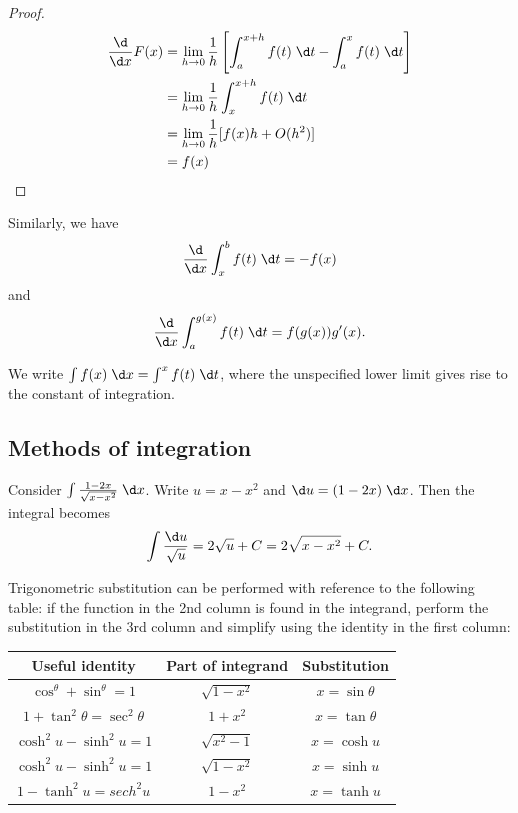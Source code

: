 \documentclass[a4paper]{article}
\begin{document}
\begin{proof}
  \begin{align*}
    \frac{\d}{\d x}F(x) &= \lim_{h\to 0}\frac{1}{h}\left[\int_a^{x+h}f(t)\;\d t - \int_a^x f(t)\;\d t\right]\\
    &= \lim_{h\to 0} \frac{1}{h}\int_x^{x+h}f(t) \;\d t\\
    &= \lim_{h\to 0} \frac{1}{h}[f(x)h + O(h^2)]\\
    &= f(x)
  \end{align*}
\end{proof}
Similarly, we have 
\[
\frac{\d}{\d x}\int_x^b f(t)\;\d t = -f(x)
\]
and
\[
\frac{\d}{\d x}\int_a^{g(x)} f(t)\;\d t = f(g(x))g'(x).
\]

\begin{notation}
  We write $\int f(x)\;\d x= \int^x f(t)\;\d t$, where the unspecified lower limit gives rise to the constant of integration.
\end{notation}

\subsection{Methods of integration}
\begin{eg}
  Consider $\int \frac{1 - 2x}{\sqrt{x - x^2}}\;\d x$. Write $u = x - x^2$ and $\d u = (1 - 2x)\;\d x$. Then the integral becomes
\[
\int \frac{\d u}{\sqrt{u}} = 2\sqrt{u} + C = 2\sqrt{x - x^2} + C.
\]
\end{eg}

Trigonometric substitution can be performed with reference to the following table: if the function in the 2nd column is found in the integrand, perform the substitution in the 3rd column and simplify using the identity in the first column:

\vspace{4pt}
\noindent
\begin{tabular}{ccc}
\toprule
Useful identity                   & Part of integrand & Substitution      \\
\midrule
$\cos^\theta + \sin^\theta = 1$   & $\sqrt{1 - x^2}$  & $x = \sin \theta$ \\
$1 + \tan^2\theta = \sec^2\theta$ & $1 + x^2$         & $x = \tan\theta$  \\
$\cosh^2u - \sinh^2 u = 1$        & $\sqrt{x^2 - 1}$  & $x=\cosh u$       \\
$\cosh^2u - \sinh^2 u = 1$        & $\sqrt{1 - x^2}$  & $x=\sinh u$       \\
$1 - \tanh^2 u = sech^2u$         & $1 - x^2$         & $x = \tanh u$     \\
\bottomrule
\end{tabular}
\end{document}
